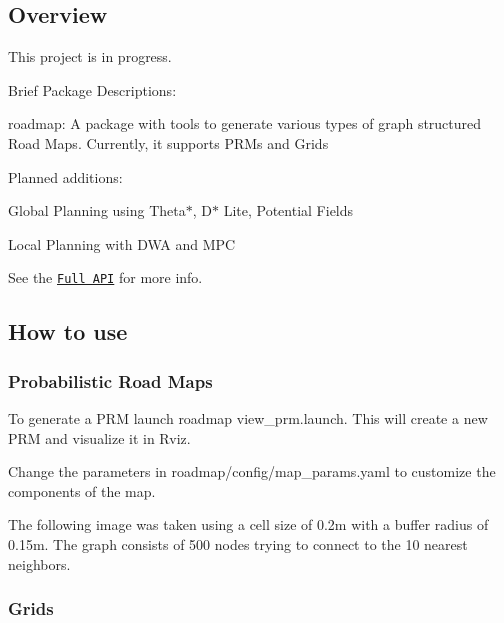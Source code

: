 \subsection*{Overview}

This project is in progress.

Brief Package Descriptions\+:
\begin{DoxyItemize}
\item {\ttfamily roadmap}\+: A package with tools to generate various types of graph structured Road Maps. Currently, it supports P\+R\+Ms and Grids
\end{DoxyItemize}

Planned additions\+:
\begin{DoxyItemize}
\item Global Planning using Theta$\ast$, D$\ast$ Lite, Potential Fields
\item Local Planning with D\+WA and M\+PC
\end{DoxyItemize}

See the \href{https://rencheckyoself.github.io/motion-planning-in-ROS/}{\tt Full A\+PI} for more info.

\subsection*{How to use}

\subsubsection*{Probabilistic Road Maps}

To generate a P\+RM launch {\ttfamily roadmap view\+\_\+prm.\+launch}. This will create a new P\+RM and visualize it in Rviz.


\begin{DoxyItemize}
\item Change the parameters in {\ttfamily roadmap/config/map\+\_\+params.\+yaml} to customize the components of the map.
\end{DoxyItemize}

The following image was taken using a cell size of 0.\+2m with a buffer radius of 0.\+15m. The graph consists of 500 nodes trying to connect to the 10 nearest neighbors.



\subsubsection*{Grids}

